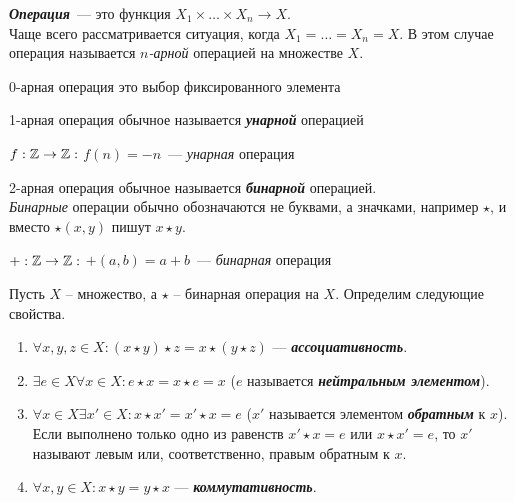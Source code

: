 \documentclass{article}
\begin{document}
\large


\setcounter{task_boxed}{0}

\begin{definition_boxed}
	\textit{\textbf{Операция}}~--- это функция $X_1 \times \dotsc \times X_n \rightarrow X.$\\
	Чаще всего рассматривается ситуация, когда $X_1 = \dotsc = X_n = X$. В этом случае операция называется $n$\textit{-арной} операцией на множестве $X$. 
\end{definition_boxed}

\begin{example}
0-арная операция это выбор фиксированного элемента
\end{example}

\begin{definition_boxed}
	1-арная операция обычное называется \textit{\textbf{унарной}} операцией
\end{definition_boxed}


\begin{example}
	$f : \mathbb{Z} \rightarrow \mathbb{Z}:$ $f(n) = -n$~--- \textit{унарная} операция
\end{example}

\begin{definition_boxed}
2-арная операция обычное называется \textit{\textbf{бинарной}} операцией.\\
\textit{Бинарные} операции обычно обозначаются не буквами, а значками, например $\star$, и вместо $\star(x, y)$ пишут $x \star y$.
\end{definition_boxed}


\begin{example}
$+ : \mathbb{Z} \rightarrow \mathbb{Z}:$ $+(a, b) = a + b$~--- \textit{бинарная} операция
\end{example}

\begin{definition_boxed}
	Пусть $X$ – множество, а $\star$ – бинарная операция на $X$. Определим следующие свойства.
	\begin{enumerate}[label*=\textbf{(\arabic{enumi})}]
		\item $\forall x,y,z \in X: (x \star y) \star z = x \star (y \star z)$ --- \textit{\textbf{ассоциативность}}.
		\item $\exists e \in X \forall x \in X: e \star x = x \star e = x$ ($e$ называется \textit{\textbf{нейтральным элементом}}).
		\item $\forall x \in X \exists x' \in X: x \star x' = x' \star x = e$ ($x'$ называется элементом \textit{\textbf{обратным}} к $x$). Если выполнено только одно из равенств $x' \star x = e$ или $x \star x' = e$, то $x'$ называют левым или, соответственно, правым обратным к $x$.
		\item $\forall x,y \in X: x \star y = y \star x$ --- \textit{\textbf{коммутативность}}.
	\end{enumerate}
\end{definition_boxed}
\end{document}
